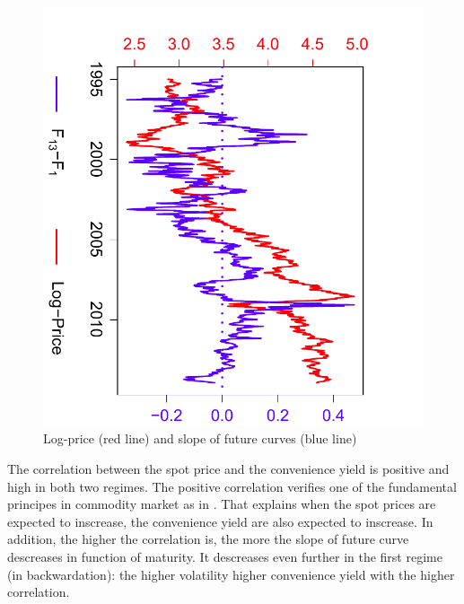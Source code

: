 \begin{figure}
\centering
\includegraphics[scale=.6]{LogPrice_TermStructure}
\caption{Log-price (red line) and slope of future curves (blue line)}
\label{fig:LogPriceTermStructure:data}
\end{figure}


The correlation between the spot price and the convenience yield is positive and high in both two regimes. The positive correlation verifies one of the fundamental principes in commodity market as in \cite{gibson:schwartz:1990}. That explains when the spot prices are expected to inscrease, the convenience yield are also expected to inscrease. In addition, the higher the correlation is, the more the slope of future curve descreases in function of maturity. It descreases even further in the first regime (in backwardation): the higher volatility higher convenience yield with the higher correlation.


